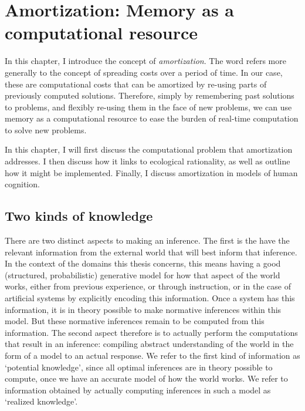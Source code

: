 \chapter{Amortization: Memory as a computational resource}
\label{chap:amort}


In this chapter, I introduce the concept of \textit{amortization}. The word refers more generally to the concept of spreading costs over a period of time. In our case, these are computational costs that can be amortized by re-using parts of previously computed solutions. Therefore, simply by remembering past solutions to problems, and flexibly re-using them in the face of new problems, we can use memory as a computational resource to ease the burden of real-time computation to solve new problems. 

In this chapter, I will first discuss the computational problem that amortization addresses. I then discuss how it links to ecological rationality, as well as outline how it might be implemented. Finally, I discuss amortization in models of human cognition.

\section{Two kinds of knowledge}

There are two distinct aspects to making an inference. The first is the have the relevant information from the external world that will best inform that inference. In the context of the domains this thesis concerns, this means having a good (structured, probabilistic) generative model for how that aspect of the world works, either from previous experience, or through instruction, or in the case of artificial systems by explicitly encoding this information. Once a system has this information, it is in theory possible to make normative inferences within this model. But these normative inferences remain to be computed from this information. The second aspect therefore is to actually perform the computations that result in an inference: compiling abstract understanding of the world in the form of a model to an actual response. We refer to the first kind of information as `potential knowledge', since all optimal inferences are in theory possible to compute, once we have an accurate model of how the world works. We refer to information obtained by actually computing inferences in such a model as `realized knowledge'. 

